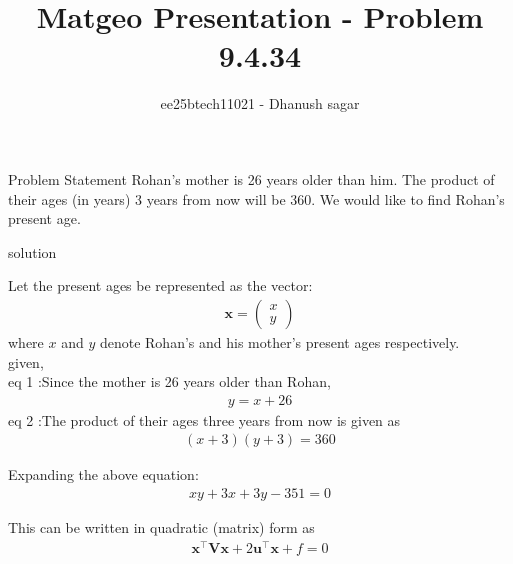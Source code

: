 \documentclass{beamer}
\title{Matgeo Presentation - Problem 9.4.34}
\author{ee25btech11021 - Dhanush sagar}
\numberwithin{equation}{section}
\theoremstyle{remark}
\newcommand{\myvec}[1]{\ensuremath{\begin{pmatrix}#1\end{pmatrix}}}
\let\vec\mathbf
\begin{document}
	

		




\begin{frame}
  \titlepage
\end{frame}

\begin{frame}{Problem Statement}
Rohan's mother is 26 years older than him. The product of their ages (in years) 3 years from now will be 360. We would like to find Rohan's present age.
\end{frame}

\begin{frame}{solution}

Let the present ages be represented as the vector:
\begin{align}
\vec{x} = \myvec{x \\ y}
\end{align}
where $x$ and $y$ denote Rohan's and his mother's present ages respectively.\\

given,\\
eq 1 :Since the mother is 26 years older than Rohan,
\begin{align}
y = x + 26
\end{align}
eq 2 :The product of their ages three years from now is given as
\begin{align}
(x+3)(y+3) = 360
\end{align}

Expanding the above equation:
\begin{align}
xy + 3x + 3y - 351 = 0
\end{align}

This can be written in quadratic (matrix) form as
\begin{align}
\vec{x}^\top \vec{V} \vec{x} + 2\vec{u}^\top \vec{x} + f = 0
\end{align}
\end{frame}
\end{document}
